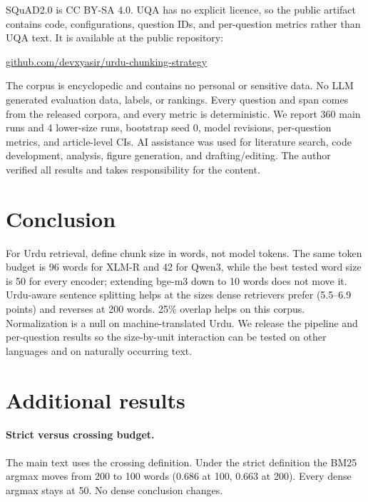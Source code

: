 \documentclass[11pt]{article}
\begin{document}
SQuAD2.0 is CC BY-SA 4.0. UQA has no explicit licence, so the public artifact contains code,
configurations, question IDs, and per-question metrics rather than UQA text. It is available at the
public repository:
\begin{flushleft}\footnotesize\href{https://github.com/devxyasir/urdu-chunking-strategy}{github.com/devxyasir/urdu-chunking-strategy}\end{flushleft}
The corpus is encyclopedic and contains no personal or sensitive data. No LLM generated evaluation data, labels, or rankings. Every question
and span comes from the released corpora, and every metric is deterministic. We report 360 main
runs and 4 lower-size runs, bootstrap seed 0, model revisions, per-question metrics, and
article-level CIs. AI assistance was
used for literature search, code development, analysis, figure generation, and drafting/editing.
The author verified all results and takes responsibility for the content.

\section{Conclusion}

For Urdu retrieval, define chunk size in words, not model tokens. The same token budget is 96 words
for XLM-R and 42 for Qwen3, while the best tested word size is 50 for every encoder; extending
bge-m3 down to 10 words does not move it. Urdu-aware sentence splitting helps at the sizes dense
retrievers prefer (5.5--6.9 points) and reverses at 200 words. 25\% overlap helps on this corpus. Normalization is a null on machine-translated Urdu. We
release the pipeline and per-question results so the size-by-unit interaction can be tested on
other languages and on naturally occurring text.



\appendix
\section{Additional results}

\paragraph{Strict versus crossing budget.}
The main text uses the crossing definition. Under the strict definition the BM25 argmax moves from
200 to 100 words (0.686 at 100, 0.663 at 200). Every dense argmax stays at 50. No dense conclusion
changes.
\end{document}
